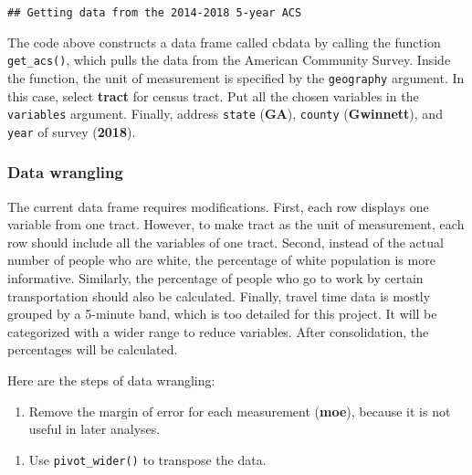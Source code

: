 \documentclass[
]{article}
\newenvironment{Shaded}{\begin{snugshade}}{\end{snugshade}}
\newcommand{\KeywordTok}[1]{\textcolor[rgb]{0.13,0.29,0.53}{\textbf{#1}}}
\newcommand{\NormalTok}[1]{#1}
\newcommand{\OperatorTok}[1]{\textcolor[rgb]{0.81,0.36,0.00}{\textbf{#1}}}
\newcommand{\StringTok}[1]{\textcolor[rgb]{0.31,0.60,0.02}{#1}}
\providecommand{\tightlist}{%
  \setlength{\itemsep}{0pt}\setlength{\parskip}{0pt}}
\begin{document}
\begin{verbatim}
## Getting data from the 2014-2018 5-year ACS
\end{verbatim}

The code above constructs a data frame called cbdata by calling the
function \texttt{get\_acs()}, which pulls the data from the American
Community Survey. Inside the function, the unit of measurement is
specified by the \texttt{geography} argument. In this case, select
\textbf{tract} for census tract. Put all the chosen variables in the
\texttt{variables} argument. Finally, address \texttt{state}
(\textbf{GA}), \texttt{county} (\textbf{Gwinnett}), and \texttt{year} of
survey (\textbf{2018}).

\hypertarget{data-wrangling}{%
\subsubsection{Data wrangling}\label{data-wrangling}}

The current data frame requires modifications. First, each row displays
one variable from one tract. However, to make tract as the unit of
measurement, each row should include all the variables of one tract.
Second, instead of the actual number of people who are white, the
percentage of white population is more informative. Similarly, the
percentage of people who go to work by certain transportation should
also be calculated. Finally, travel time data is mostly grouped by a
5-minute band, which is too detailed for this project. It will be
categorized with a wider range to reduce variables. After consolidation,
the percentages will be calculated.

Here are the steps of data wrangling:

\begin{enumerate}
\def\labelenumi{\arabic{enumi}.}
\tightlist
\item
  Remove the margin of error for each measurement (\textbf{moe}),
  because it is not useful in later analyses.
\end{enumerate}

\begin{Shaded}
\end{Shaded}

\begin{enumerate}
\def\labelenumi{\arabic{enumi}.}
\setcounter{enumi}{1}
\tightlist
\item
  Use \texttt{pivot\_wider()} to transpose the data.
\end{enumerate}
\end{document}
